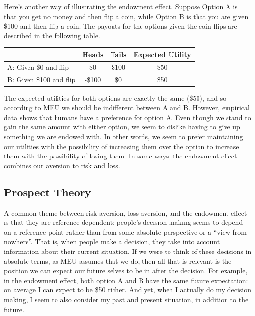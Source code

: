 \documentclass[]{tufte-book}
\begin{document}
Here's another way of illustrating the endowment effect. Suppose Option A is that you get no money and then flip a coin, while Option B is that you are given \$100 and then flip a coin. The payouts for the options given the coin flips are described in the following table.

\begin{longtable}[]{@{}lccc@{}}
\toprule
& Heads & Tails & Expected Utility\tabularnewline
\midrule
\endhead
A: Given \$0 and flip & \$0 & \$100 & \$50\tabularnewline
B: Given \$100 and flip & -\$100 & \$0 & \$50\tabularnewline
\bottomrule
\end{longtable}

The expected utilities for both options are exactly the same (\$50), and so according to MEU we should be indifferent between A and B. However, empirical data shows that humans have a preference for option A. Even though we stand to gain the same amount with either option, we seem to dislike having to give up something we are endowed with. In other words, we seem to prefer maintaining our utilities with the possibility of increasing them over the option to increase them with the possibility of losing them. In some ways, the endowment effect combines our aversion to risk and loss.

\hypertarget{prospect-theory}{%
\subsection{Prospect Theory}\label{prospect-theory}}

A common theme between risk aversion, loss aversion, and the endowment effect is that they are reference dependent: people's decision making seems to depend on a reference point rather than from some absolute perspective or a ``view from nowhere''. That is, when people make a decision, they take into account information about their current situation. If we were to think of these decisions in absolute terms, as MEU assumes that we do, then all that is relevant is the position we can expect our future selves to be in after the decision. For example, in the endowment effect, both option A and B have the same future expectation: on average I can expect to be \$50 richer. And yet, when I actually do my decision making, I seem to also consider my past and present situation, in addition to the future.
\end{document}
